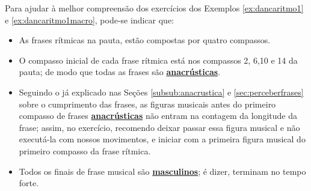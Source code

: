 \begin{tcbattention}
Para ajudar à melhor compreensão dos exercícios dos Exemplos \ref{ex:dancaritmo1} e \ref{ex:dancaritmo1macro}, 
pode-se indicar que: 
\begin{itemize}
\item As frases rítmicas na pauta, 
estão compostas  por quatro compassos.
\item O compasso inicial de cada frase rítmica
está nos compassos 2, 6,10 e 14 da pauta; de modo que todas as frases são 
\hyperref[subsub:anacrustica]{\textbf{anacrústicas}}.
\item Seguindo o já explicado nas Seções \ref{subsub:anacrustica} e \ref{sec:perceberfrases} 
sobre o cumprimento das frases, 
as figuras musicais antes do primeiro compasso de frases 
\hyperref[subsub:anacrustica]{\textbf{anacrústicas}} não entram na contagem da longitude da frase;
assim, no exercício, recomendo deixar passar essa figura musical e não executá-la com nossos movimentos,
e iniciar com a primeira figura musical do primeiro compasso da frase rítmica.
\item Todos os finais de frase musical são \hyperref[subsec:finaldefrasemus1]{\textbf{masculinos}};
é dizer, terminam no tempo forte.
\end{itemize}
\end{tcbattention}

